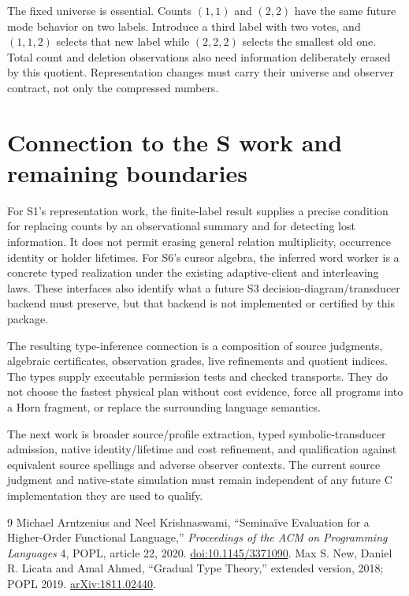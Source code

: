 \documentclass[11pt,a4paper]{article}
\begin{document}
The fixed universe is essential. Counts $(1,1)$ and $(2,2)$ have the same
future mode behavior on two labels. Introduce a third label with two votes,
and $(1,1,2)$ selects that new label while $(2,2,2)$ selects the smallest old
one. Total count and deletion observations also need information deliberately
erased by this quotient. Representation changes must carry their universe and
observer contract, not only the compressed numbers.

\section{Connection to the S work and remaining boundaries}

For S1's representation work, the finite-label result supplies a precise
condition for replacing counts by an observational summary and for detecting
lost information. It does not permit erasing general relation multiplicity,
occurrence identity or holder lifetimes. For S6's cursor algebra, the inferred
word worker is a concrete typed realization under the existing adaptive-client
and interleaving laws. These interfaces also identify what a future S3
decision-diagram/transducer backend must preserve, but that backend is not
implemented or certified by this package.

The resulting type-inference connection is a composition of source judgments,
algebraic certificates, observation grades, live refinements and quotient
indices. The types supply executable permission tests and checked transports.
They do not choose the fastest physical plan without cost evidence, force all
programs into a Horn fragment, or replace the surrounding language semantics.

The next work is broader source/profile extraction, typed symbolic-transducer
admission, native identity/lifetime and cost refinement, and qualification
against equivalent source spellings and adverse observer contexts. The current
source judgment and native-state simulation must remain independent of any
future C implementation they are used to qualify.

\begin{thebibliography}{9}
 Michael Arntzenius and Neel Krishnaswami,
``Semina\"ive Evaluation for a Higher-Order Functional Language,''
\emph{Proceedings of the ACM on Programming Languages} 4, POPL, article 22,
2020. \href{https://doi.org/10.1145/3371090}{doi:10.1145/3371090}.
 Max S. New, Daniel R. Licata and Amal Ahmed,
``Gradual Type Theory,'' extended version, 2018; POPL 2019.
\href{https://arxiv.org/abs/1811.02440}{arXiv:1811.02440}.
\end{thebibliography}
\end{document}
